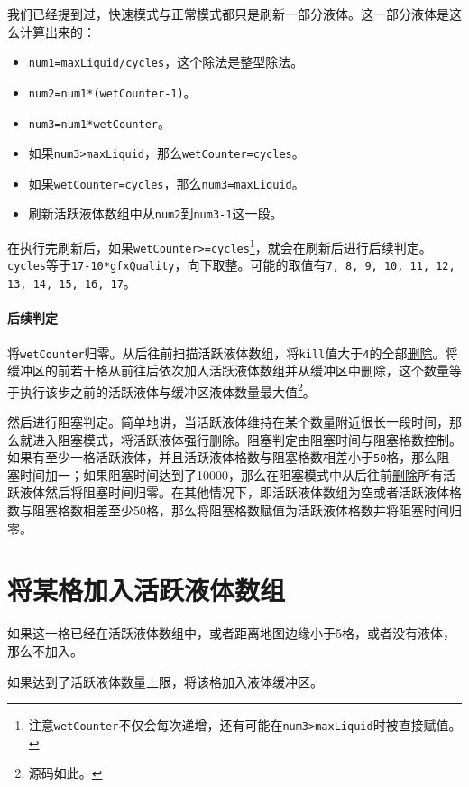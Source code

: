 {我们已经提到过，快速模式与正常模式都只是刷新一部分液体。这一部分液体是这么计算出来的：
\begin{itemize}
    \item \lstinline{num1=maxLiquid/cycles}，这个除法是整型除法。
    \item \lstinline{num2=num1*(wetCounter-1)}。
    \item \lstinline{num3=num1*wetCounter}。
    \item 如果\lstinline{num3>maxLiquid}，那么\lstinline{wetCounter=cycles}。
    \item 如果\lstinline{wetCounter=cycles}，那么\lstinline{num3=maxLiquid}。
    \item 刷新活跃液体数组中从\lstinline{num2}到\lstinline{num3-1}这一段。
\end{itemize}

在执行完刷新后，如果\lstinline{wetCounter>=cycles}\footnote{注意\lstinline{wetCounter}不仅会每次递增，还有可能在\lstinline{num3>maxLiquid}时被直接赋值。}，就会在刷新后进行后续判定。\lstinline{cycles}等于\lstinline{17-10*gfxQuality}，向下取整。可能的取值有\lstinline{7, 8, 9, 10, 11, 12, 13, 14, 15, 16, 17}。

\paragraph*{后续判定}\label{app29}
将\lstinline{wetCounter}归零。从后往前扫描活跃液体数组，将\lstinline{kill}值大于\lstinline{4}的全部\hyperref[app28]{删除}。将缓冲区的前若干格从前往后依次加入活跃液体数组并从缓冲区中删除，这个数量等于执行该步之前的活跃液体与缓冲区液体数量最大值\footnote{源码如此。}。

然后进行阻塞判定。简单地讲，当活跃液体维持在某个数量附近很长一段时间，那么就进入阻塞模式，将活跃液体强行删除。阻塞判定由阻塞时间与阻塞格数控制。如果有至少一格活跃液体，并且活跃液体格数与阻塞格数相差小于\lstinline{50}格，那么阻塞时间加一；如果阻塞时间达到了10000，那么在阻塞模式中从后往前\hyperref[app28]{删除}所有活跃液体然后将阻塞时间归零。在其他情况下，即活跃液体数组为空或者活跃液体格数与阻塞格数相差至少50格，那么将阻塞格数赋值为活跃液体格数并将阻塞时间归零。

\section{将某格加入活跃液体数组}
如果这一格已经在活跃液体数组中，或者距离地图边缘小于5格，或者没有液体，那么不加入。

如果达到了活跃液体数量上限，将该格加入液体缓冲区。

}
